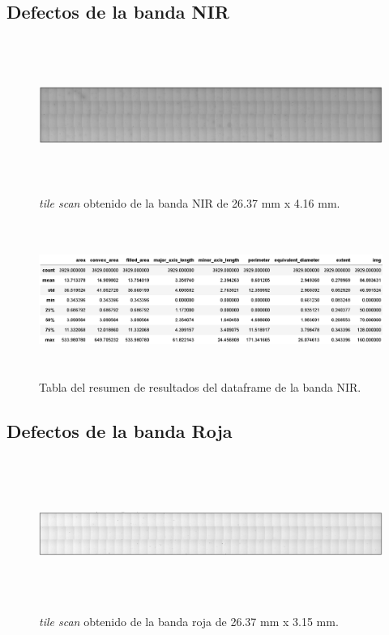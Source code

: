 \singlespacing
\subsection*{Defectos de la banda NIR}


\begin{figure}[H]
	\centering
	\includegraphics[width=1.0\textwidth,height= 5.0cm]{Figs/resultados_defectos/banda_nir.png}
	\caption{\textit{tile scan} obtenido de la banda NIR de 26.37 mm x 4.16 mm.}
	\label{fig:bgcel}
\end{figure}


\begin{figure}[H]
	\centering
	\includegraphics[width=1.0\textwidth,height= 5.0cm]{Figs/resultados_defectos/tabla_nir.png}
	\caption{Tabla del resumen de resultados del dataframe de la banda NIR.}
	\label{fig:bgcel}
\end{figure}

\singlespacing
\subsection*{Defectos de la banda Roja}


\begin{figure}[H]
	\centering
	\includegraphics[width=1.0\textwidth,height= 5.0cm]{Figs/resultados_defectos/banda_roja.png}
	\caption{\textit{tile scan} obtenido de la banda roja de 26.37 mm x 3.15 mm.}
	\label{fig:bgcel}
\end{figure}


